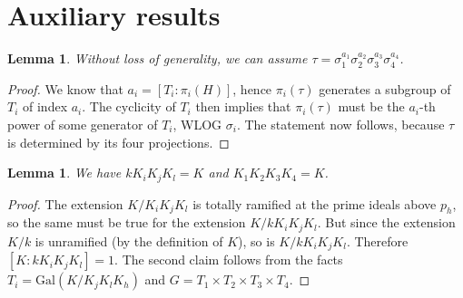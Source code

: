 \documentclass[12pt,a4paper]{article}
\newtheorem{lemma}[theorem]{Lemma}
\theoremstyle{definition}
\newcommand{\Q}{\mathbb{Q}}
\newcommand{\Gal}{\mathrm{Gal}}
\begin{document}
\section{Auxiliary results}
\begin{lemma}\label{tau}
Without loss of generality, we can assume $\tau=\sigma_1^{a_1}\sigma_2^{a_2}\sigma_3^{a_3}\sigma_4^{a_4}$.
\end{lemma}
\begin{proof}
We know that $a_i=[T_i:\pi_i(H)]$, hence
$\pi_i(\tau)$ generates a subgroup of $T_i$ of index $a_i$. The cyclicity of $T_i$ then implies that $\pi_i(\tau)$ must be the $a_i$-th power of some generator of $T_i$, WLOG $\sigma_i$. The statement now follows, because $\tau$ is determined by its four projections.
\end{proof}

\begin{lemma}\label{comp}
We have $kK_iK_jK_l=K$ and $K_1K_2K_3K_4=K$.
\end{lemma}
\begin{proof}
The extension $K/K_iK_jK_l$ is totally ramified at the prime ideals above $p_h$, so the same must be true for the extension $K/kK_iK_jK_l$. But since the extension $K/k$ is unramified (by the definition of $K$), so is $K/kK_iK_jK_l$. Therefore $[K:kK_iK_jK_l]=1$. The second claim follows from the facts %
$T_i=\Gal(K/K_jK_lK_h)$ and $G=T_1\times T_2\times T_3\times T_4$.
\end{proof}
\begin{center}
\end{center}
\end{document}
